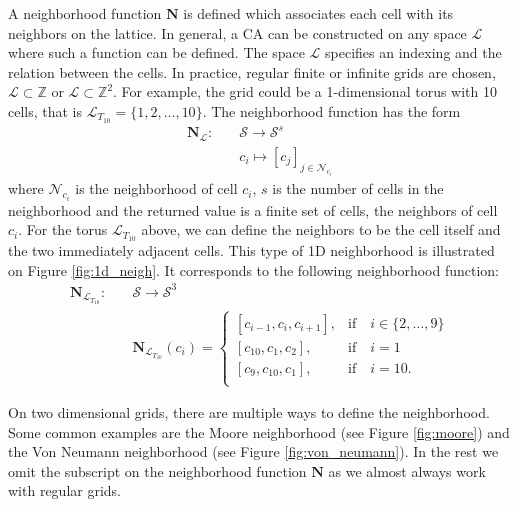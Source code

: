 A neighborhood function $\boldsymbol{N}$ is defined which associates each cell
with its neighbors on the lattice. In general, a \ac{CA} can be constructed on
any space $\mathcal{L}$ where such a function can be defined. The space $\mathcal{L}$ specifies an
indexing and the relation between the cells. In practice, regular finite or
infinite grids are chosen, $\mathcal{L} \subset \mathbb{Z}$ or $\mathcal{L} \subset \mathbb{Z}^{2}$. For example, the grid could
be a 1-dimensional torus with 10 cells, that is
$\mathcal{L}_{{T_{10}}} = \{1, 2, \ldots, 10 \}$. The neighborhood function has the form
\begin{equation}
  \begin{aligned}
\boldsymbol{N}_{\mathcal{L}} :\quad & \mathcal{S} \rightarrow \mathcal{S}^{s}\\
&c_{i} \mapsto [c_{j}]_{j\in \mathcal{N}_{c_{i}}}
  \end{aligned}
\end{equation}
where $\mathcal{N}_{c_{i}}$ is the neighborhood of cell $c_{i}$, $s$ is the number of
cells in the neighborhood and the returned value is a finite set of cells, the
neighbors of cell $c_{i}$. For the torus $\mathcal{L}_{T_{10}}$ above, we can define the
neighbors to be the cell itself and the two immediately adjacent cells. This
type of 1D neighborhood is illustrated on Figure \ref{fig:1d_neigh}. It
corresponds to the following neighborhood function:
\begin{equation}
  \begin{aligned}
\boldsymbol{N}_{\mathcal{L}_{T_{10}}} :\quad & \mathcal{S} \rightarrow \mathcal{S}^{3} \\
&\boldsymbol{N}_{\mathcal{L}_{T_{10}}}(c_{i}) = \begin{cases}
                      [c_{i - 1}, c_{i}, c_{i + 1}],& \text{if}\quad i \in \{2,\ldots , 9\}\\
                       [c_{10}, c_{1}, c_{2}], & \text{if} \quad i = 1 \\
                       [c_{9}, c_{10}, c_{1}], & \text{if} \quad i = 10. \\
                    \end{cases}
  \end{aligned}
  \label{eq:torus_index}
\end{equation}

On two dimensional grids, there are multiple ways to define the neighborhood.
Some common examples are the Moore neighborhood (see Figure \ref{fig:moore}) and
the Von Neumann neighborhood (see Figure \ref{fig:von_neumann}). In the rest we
omit the subscript on the neighborhood function $\boldsymbol{N}$ as we almost
always work with regular grids.

